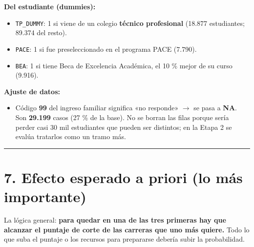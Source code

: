 \documentclass[11pt]{article}
\begin{document}
\textbf{Del estudiante (dummies):}\par
\begin{itemize}
\item \texttt{TP\_DUMMY}: 1 si viene de un colegio \textbf{técnico profesional} (18.877 estudiantes; 89.374 del resto).
\item \texttt{PACE}: 1 si fue preseleccionado en el programa PACE (7.790).
\item \texttt{BEA}: 1 si tiene Beca de Excelencia Académica, el 10 \% mejor de su curso (9.916).
\end{itemize}

\textbf{Ajuste de datos:}\par
\begin{itemize}
\item Código \textbf{99} del ingreso familiar significa «no responde» $\rightarrow$ se pasa a \textbf{NA}. Son \textbf{29.199} casos (27 \% de la base). No se borran las filas porque sería perder casi 30 mil estudiantes que pueden ser distintos; en la Etapa 2 se evalúa tratarlos como un tramo más.
\end{itemize}

\medskip\hrule\medskip

\section*{7. Efecto esperado a priori (lo más importante)}

La lógica general: \textbf{para quedar en una de las tres primeras hay que alcanzar el puntaje de corte de las carreras que uno más quiere.} Todo lo que suba el puntaje o los recursos para prepararse debería subir la probabilidad.\par
\end{document}
